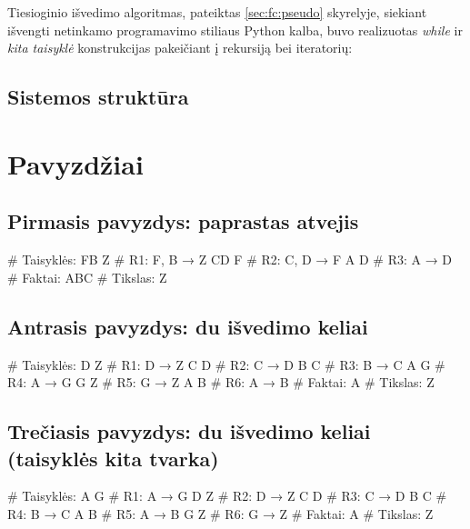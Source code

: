 Tiesioginio išvedimo algoritmas, pateiktas \ref{sec:fc:pseudo}
skyrelyje, siekiant išvengti netinkamo programavimo stiliaus Python
kalba, buvo realizuotas \emph{while} ir \emph{kita taisyklė}
konstrukcijas pakeičiant į rekursiją bei iteratorių:


\subsection{Sistemos struktūra}


\section{Pavyzdžiai}

\subsection{Pirmasis pavyzdys: paprastas atvejis}

\begin{pythonaienv}[fc]
# Taisyklės:
FB Z                                    # R1: F, B → Z
CD F                                    # R2: C, D → F
A D                                     # R3: A → D
# Faktai:
ABC
# Tikslas:
Z
\end{pythonaienv}

\subsection{Antrasis pavyzdys: du išvedimo keliai}

\begin{pythonaienv}[fc]
# Taisyklės:
D Z                                     # R1: D → Z
C D                                     # R2: C → D
B C                                     # R3: B → C
A G                                     # R4: A → G
G Z                                     # R5: G → Z
A B                                     # R6: A → B
# Faktai:
A
# Tikslas:
Z
\end{pythonaienv}

\subsection{Trečiasis pavyzdys: du išvedimo keliai (taisyklės kita tvarka)}

\begin{pythonaienv}[fc]
# Taisyklės:
A G                                     # R1: A → G
D Z                                     # R2: D → Z
C D                                     # R3: C → D
B C                                     # R4: B → C
A B                                     # R5: A → B
G Z                                     # R6: G → Z
# Faktai:
A
# Tikslas:
Z
\end{pythonaienv}

